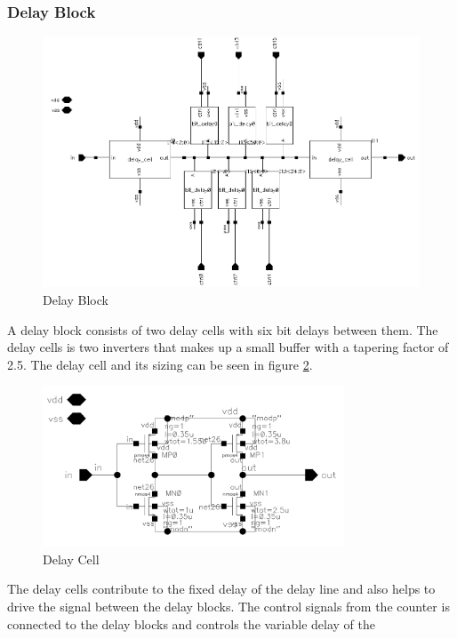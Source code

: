 \documentclass[a4paper,12pt]{article} \usepackage{graphicx}
\begin{document}
\subsubsection{Delay Block}
\begin{figure}[h]
        \centering
        \includegraphics[width=\textwidth]{../Bilder/Delay_Line/Delay_cell.png}
        \caption{Delay Block}
        \label{fig:del_bl}
\end{figure}
A delay block consists of two delay cells with six bit delays between
them. The delay cells is two inverters that makes up a small buffer with a
tapering factor of 2.5. The delay cell and its sizing can be seen in figure
\ref{fig:del_cell}. 
\begin{figure}[h]
        \centering
        \includegraphics[width=0.8\textwidth]{../Bilder/Delay_Line/Delay_inv.png}
        \caption{Delay Cell}
        \label{fig:del_cell}
\end{figure}
The delay cells contribute to the fixed delay of the delay line and also helps
to drive the signal between the delay blocks. The control signals from the
counter is connected to the delay blocks and controls the variable delay of the
\end{document}
